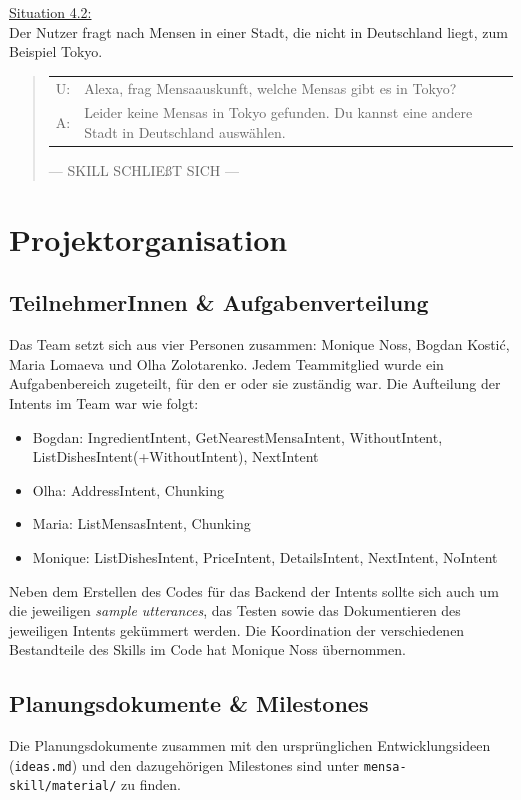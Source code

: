 \documentclass[12pt]{article}
\begin{document}
\ul{Situation 4.2:}\\Der Nutzer fragt nach Mensen in einer Stadt, die nicht in Deutschland liegt, zum Beispiel Tokyo.
\begin{quote}
\begin{tabular}{lp{12cm}}
  U:& Alexa, frag Mensaauskunft, welche Mensas gibt es in Tokyo?\\
  A:& Leider keine Mensas in Tokyo gefunden. Du kannst eine andere Stadt in Deutschland auswählen.\\[0.2cm]
\end{tabular}
--- SKILL SCHLIEßT SICH ---\\
\end{quote}

\section{Projektorganisation}
\subsection{TeilnehmerInnen \& Aufgabenverteilung}
Das Team setzt sich aus vier Personen zusammen: Monique Noss, Bogdan Kostić, Maria Lomaeva und Olha Zolotarenko. 
Jedem Teammitglied wurde ein Aufgabenbereich zugeteilt, für den er oder sie zuständig war.
Die Aufteilung der Intents im Team war wie folgt:
\begin{itemize}
  \setlength\itemsep{0em}
  \item Bogdan: IngredientIntent, GetNearestMensaIntent, WithoutIntent, ListDishesIntent(+WithoutIntent), NextIntent
  \item Olha: AddressIntent, Chunking
  \item Maria: ListMensasIntent, Chunking
  \item Monique: ListDishesIntent, PriceIntent, DetailsIntent, NextIntent, NoIntent
\end{itemize}

Neben dem Erstellen des Codes für das Backend der Intents sollte sich auch um die jeweiligen \emph{sample utterances}, das Testen sowie das Dokumentieren des jeweiligen Intents gekümmert werden.
Die Koordination der verschiedenen Bestandteile des Skills im Code hat Monique Noss übernommen.

\subsection{Planungsdokumente \& Milestones}
Die Planungsdokumente zusammen mit den ursprünglichen Entwicklungsideen (\texttt{ideas.md}) und den dazugehörigen Milestones sind unter \texttt{mensa-skill/material/} zu finden. 
\end{document}
